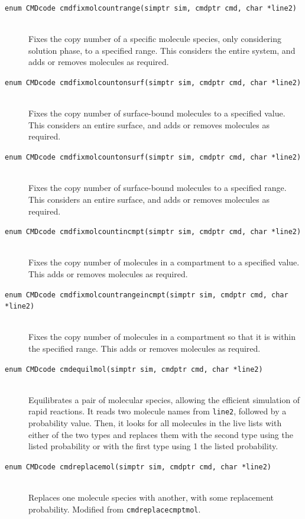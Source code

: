 \documentclass {scrbook}
\newcommand {\ttt} {\texttt}
\begin{document}
\begin{description}
\item[\ttt{enum CMDcode cmdfixmolcountrange(simptr sim, cmdptr cmd, char *line2)}]
\hfill \\
Fixes the copy number of a specific molecule species, only considering solution phase, to a specified range. This considers the entire system, and adds or removes molecules as required.

\item[\ttt{enum CMDcode cmdfixmolcountonsurf(simptr sim, cmdptr cmd, char *line2)}]
\hfill \\
Fixes the copy number of surface-bound molecules to a specified value. This considers an entire surface, and adds or removes molecules as required.

\item[\ttt{enum CMDcode cmdfixmolcountonsurf(simptr sim, cmdptr cmd, char *line2)}]
\hfill \\
Fixes the copy number of surface-bound molecules to a specified range. This considers an entire surface, and adds or removes molecules as required.

\item[\ttt{enum CMDcode cmdfixmolcountincmpt(simptr sim, cmdptr cmd, char *line2)}]
\hfill \\
Fixes the copy number of molecules in a compartment to a specified value. This adds or removes molecules as required.

\item[\ttt{enum CMDcode cmdfixmolcountrangeincmpt(simptr sim, cmdptr cmd, char *line2)}]
\hfill \\
Fixes the copy number of molecules in a compartment so that it is within the specified range. This adds or removes molecules as required.

\item[\ttt{enum CMDcode cmdequilmol(simptr sim, cmdptr cmd, char *line2)}]
\hfill \\
Equilibrates a pair of molecular species, allowing the efficient simulation of rapid reactions. It reads two molecule names from \ttt{line2}, followed by a probability value. Then, it looks for all molecules in the live lists with either of the two types and replaces them with the second type using the listed probability or with the first type using 1 the listed probability.

\item[\ttt{enum CMDcode cmdreplacemol(simptr sim, cmdptr cmd, char *line2)}]
\hfill \\
Replaces one molecule species with another, with some replacement probability. Modified from \ttt{cmdreplacecmptmol}.


\end{description}
\end{document}
